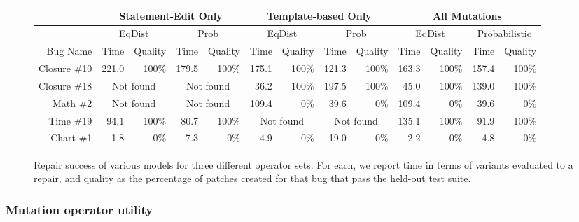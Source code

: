 \documentclass[conference]{IEEEtran}
\begin{document}
\begin{figure}\centering
\begin{tabular}{r|rr|rr|rr|rr|rr|rr}
\hline
 &\multicolumn{4}{c|}{Statement-Edit Only} & \multicolumn{4}{c|}{Template-based Only} & \multicolumn{4}{c}{All Mutations} \\ 
  \hline
 & \multicolumn{2}{c|}{EqDist} & \multicolumn{2}{c|}{Prob} & \multicolumn{2}{c|}{EqDist} & \multicolumn{2}{c|}{Prob} & \multicolumn{2}{c|}{EqDist} & 
 \multicolumn{2}{c}{Probabilistic} \\
\hline
Bug Name & Time & Quality &  Time & Quality &  Time & Quality&  Time & Quality&  Time & Quality&  Time & Quality \\
  \hline
 
  Closure \#10 & {221.0}& {100\%} & {179.5} &{100\%} & {175.1}&{100\%} & {121.3}&{100\%} & {163.3}&{100\%} & {157.4}&{100\%} \\

 Closure \#18 & \multicolumn{2}{c|}{Not found} & \multicolumn{2}{c|}{Not found} & {36.2}&{100\%} & {197.5}&{100\%} & {45.0}&{100\%} & {139.0}&{100\%} \\

Math \#2 & \multicolumn{2}{c|}{Not found} & \multicolumn{2}{c|}{Not found} & {109.4}&{0\%} & {39.6}&{0\%} & {109.4}&{0\%} & {39.6}&{0\%} \\

 Time \#19 & {94.1}&{100\%} & {80.7}&{100\%} & \multicolumn{2}{c|}{Not found} & \multicolumn{2}{c|}{Not found} & {135.1}&{100\%} & {91.9}&{100\%} \\

 Chart \#1 & {1.8}&{0\%} & {7.3}&{0\%} & {4.9}&{0\%} & {19.0}&{0\%} & {2.2}&{0\%} & {4.8}&{0\%} \\
\hline

\end{tabular}
\newline
\center
		\caption{Repair success of various models for three different operator
          sets.  For each, we report time in terms of variants evaluated to a
          repair, and quality as the percentage of patches created for that bug that pass the held-out test suite. \label{tab:singleLineBugs}}

\end{figure}


\subsubsection{Mutation operator utility} \label{oputil}
\end{document}
